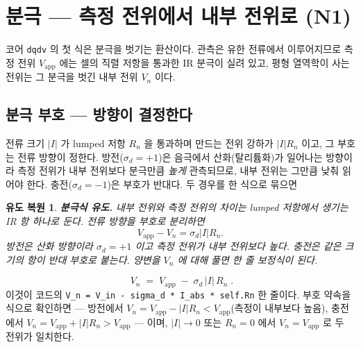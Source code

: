 \documentclass[11pt,a4paper]{article}
\newtheorem*{derivebox}{유도 복원}
\newcommand{\app}{\mathrm{app}}
\newcommand{\code}[1]{\texttt{#1}}
\begin{document}
\section{분극 — 측정 전위에서 내부 전위로 (N1)}\label{sec:pol}
코어 \code{dqdv} 의 첫 식은 분극을 벗기는 환산이다. 관측은 유한 전류에서 이루어지므로 측정 전위 $V_\app$ 에는 셀의
직렬 저항을 통과한 IR 분극이 실려 있고, 평형 열역학이 사는 전위는 그 분극을 벗긴 내부 전위 $V_n$ 이다.

\subsection{분극 부호 — 방향이 결정한다}
전류 크기 $|I|$ 가 lumped 저항 $R_n$ 을 통과하며 만드는 전위 강하가 $|I|R_n$ 이고, 그 부호는 전류 방향이 정한다.
방전($\sigma_d=+1$)은 음극에서 산화(탈리튬화)가 일어나는 방향이라 측정 전위가 내부 전위보다 분극만큼 \emph{높게}
관측되므로, 내부 전위는 그만큼 낮춰 읽어야 한다. 충전($\sigma_d=-1$)은 부호가 반대다. 두 경우를 한 식으로 묶으면

\begin{derivebox}
\textbf{분극식 유도.} 내부 전위와 측정 전위의 차이는 lumped 저항에서 생기는 IR 항 하나로 둔다. 전류 방향을 부호로 분리하면
\begin{equation*}
  V_{\app}-V_n=\sigma_d |I|R_n .
\end{equation*}
방전은 산화 방향이라 $\sigma_d=+1$ 이고 측정 전위가 내부 전위보다 높다. 충전은 같은 크기의 항이 반대 부호로 붙는다. 양변을 $V_n$ 에 대해 풀면 한 줄 보정식이 된다.
\end{derivebox}

\begin{equation}
\boxed{\;V_n\;=\;V_\app\;-\;\sigma_d\,|I|\,R_n\;.}
\label{eq:vn}
\end{equation}
이것이 코드의 \code{V\_n = V\_in - sigma\_d * I\_abs * self.Rn} 한 줄이다. 부호 약속을 식으로 확인하면 —
방전에서 $V_n=V_\app-|I|R_n<V_\app$(측정이 내부보다 높음), 충전에서 $V_n=V_\app+|I|R_n>V_\app$ — 이며,
$|I|\to0$ 또는 $R_n=0$ 에서 $V_n=V_\app$ 로 두 전위가 일치한다.
\end{document}
